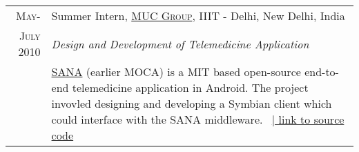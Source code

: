 \documentclass[a4paper,11pt]{article} %
\begin{document}
\begin{longtable}{r|p{15cm}}

\textsc{May-} & Summer Intern, \href{http://muc.iiitd.edu.in/muc/}{\textsc{MUC Group}}, IIIT - Delhi, New Delhi, India \emph{}\\
\textsc{July 2010} & \emph{Design and Development of Telemedicine Application}\\ 
& \small{\href{http://sana.mit.edu}{SANA} (earlier MOCA) is a MIT based open-source end-to-end telemedicine application in Android. The project invovled designing and developing a Symbian client which could interface with the SANA middleware.} \ \href{https://code.google.com/p/moca/}{\hfill | link to source code}
\end{longtable}



%
%	
%


\end{document}
